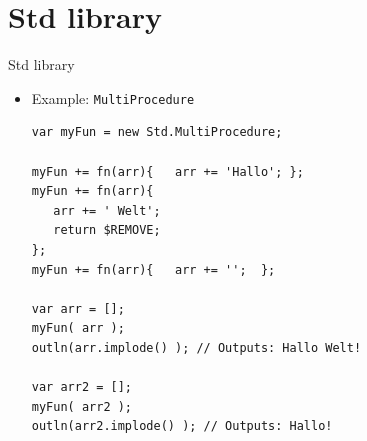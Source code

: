 \documentclass[ucs,9pt]{beamer}
\begin{document}
\section{Std library}
\begin{frame}[fragile]{Std library}
	\begin{itemize}
		\item Example: \lstinline!MultiProcedure!
		\begin{lstlisting}
var myFun = new Std.MultiProcedure;

myFun += fn(arr){	arr += 'Hallo'; };
myFun += fn(arr){	
   arr += ' Welt'; 
   return $REMOVE;
};  
myFun += fn(arr){	arr += '';  };

var arr = [];
myFun( arr );
outln(arr.implode() ); // Outputs: Hallo Welt!

var arr2 = [];
myFun( arr2 );
outln(arr2.implode() ); // Outputs: Hallo!

		\end{lstlisting}
	\end{itemize}
	
\end{frame}
%
\end{document}
